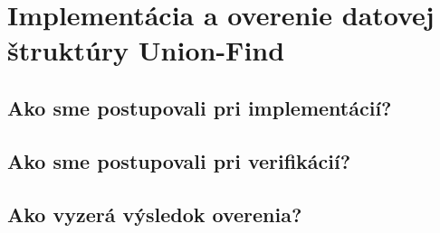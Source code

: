 \chapter{Implementácia a overenie datovej štruktúry Union-Find}

\section{Ako sme postupovali pri implementácií?}

\section{Ako sme postupovali pri verifikácií?}

\section{Ako vyzerá výsledok overenia?}